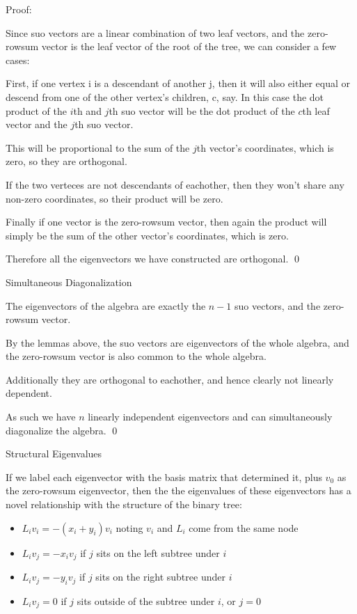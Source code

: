 \documentclass[10pt,a4paper]{report}
\begin{document}
Proof:

Since suo vectors are a linear combination of two leaf vectors, and the
zero-rowsum vector is the leaf vector of the root of the tree, we can consider
a few cases:

First, if one vertex i is a descendant of another j, then it will also either
equal or descend from one of the other vertex's children, c, say.  In this case
the dot product of the $i$th and $j$th suo vector will be the dot product of
the $c$th leaf vector and the $j$th suo vector.

This will be proportional to the sum of the $j$th vector's coordinates, which
is zero, so they are orthogonal.

If the two verteces are not descendants of eachother, then they won't share any
non-zero coordinates, so their product will be zero.

Finally if one vector is the zero-rowsum vector, then again the product will
simply be the sum of the other vector's coordinates, which is zero.

Therefore all the eigenvectors we have constructed are orthogonal. \qed

\begin{theorem} Simultaneous Diagonalization

	The eigenvectors of the algebra are exactly the $n-1$ suo vectors, and the
	zero-rowsum vector.
\end{theorem}

By the lemmas above, the suo vectors are eigenvectors of the whole algebra, and
the zero-rowsum vector is also common to the whole algebra.

Additionally they are orthogonal to eachother, and hence clearly not linearly
dependent.

As such we have $n$ linearly independent eigenvectors and can simultaneously
diagonalize the algebra. \qed

\begin{lemma} Structural Eigenvalues

	If we label each eigenvector with the basis matrix that determined it, plus
	$v_0$ as the zero-rowsum eigenvector, then the the eigenvalues of these
	eigenvectors has a novel relationship with the structure of the binary
	tree:
	\begin{itemize}
		\item ${L_i}{v_i} = -(x_i + y_i)v_i$ noting $v_i$ and $L_i$ come from
			the same node
		\item ${L_i}{v_j} = -{x_i}{v_j}$ if $j$ sits on the left subtree under
			$i$
		\item ${L_i}{v_j} = -{y_i}{v_j}$ if $j$ sits on the right subtree under
			$i$
		\item ${L_i}{v_j} = 0$ if $j$ sits outside of the subtree under $i$, or
			$j=0$
	\end{itemize}
\end{lemma}
\end{document}
